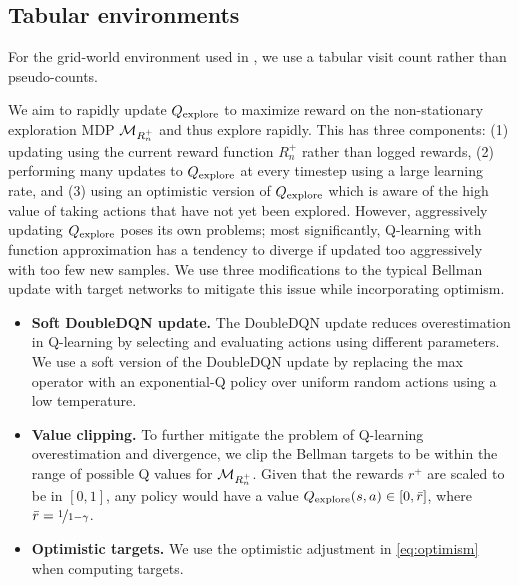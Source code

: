 \begin{subappendices}
\subsection{Tabular environments}
For the grid-world environment used in , we use a tabular visit count rather than pseudo-counts.


 \label{sec:fast_updates_appendix}

We aim to rapidly update $Q_{\text{explore}}$ to maximize reward on the non-stationary exploration MDP $\mathcal{M}_{R^+_n}$ and thus explore rapidly.
This has three components: (1) updating using the current reward function $R^+_n$ rather than logged rewards, (2) performing many updates to $Q_{\text{explore}}$ at every timestep using a large learning rate, and (3) using an optimistic version of $Q_{\text{explore}}$ which is aware of the high value of taking actions that have not yet been explored.
However, aggressively updating $Q_{\text{explore}}$ poses its own problems; most significantly, Q-learning with function approximation has a tendency to diverge if updated too aggressively with too few new samples.
We use three modifications to the typical Bellman update with target networks \citep{mnih2015human} to mitigate this issue while incorporating optimism.

\begin{itemize}
    \item \textbf{Soft DoubleDQN update.} The DoubleDQN \citep{Hasselt2016DeepRL} update reduces overestimation in Q-learning by selecting and evaluating actions using different parameters.
    We use a soft version of the DoubleDQN update by replacing the max operator with an exponential-Q policy over uniform random actions using a low temperature.
    \item \textbf{Value clipping.} To further mitigate the problem of Q-learning overestimation and divergence, we clip the Bellman targets to be within the range of possible Q values for $\mathcal{M}_{R^+_n}$.
    Given that the rewards $r^+$ are scaled to be in $[0, 1]$, any policy would have a value $Q_{\text{explore}}(s, a) \in [0, \bar{r}]$, where $\bar{r} = \nicefrac{1}{1 - \gamma}$.
    \item \textbf{Optimistic targets.} We use the optimistic adjustment in \cref{eq:optimism} when computing targets.
\end{itemize}


\end{subappendices}
